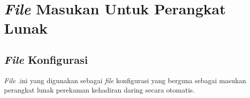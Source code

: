 \chapter{\textit{File} Masukan Untuk Perangkat Lunak}
\label{lamp:A}

%
%
%
\section{\textit{File} Konfigurasi}
\textit{File} .ini yang digunakan sebagai \textit{file} konfigurasi yang berguna sebagai masukan perangkat lunak perekaman kehadiran daring secara otomatis.
 

